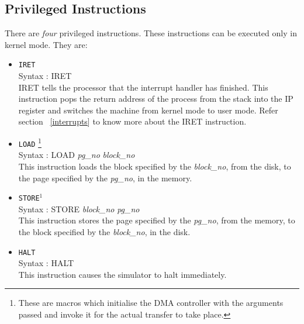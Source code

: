 \subsection{Privileged Instructions}
\label{sec:prvlgd}
There are \emph{four} privileged instructions. These instructions can be executed only in kernel mode. They are:
\begin{itemize}
	\item \texttt{IRET} \\
	Syntax : IRET \\
	IRET tells the processor that the interrupt handler has finished. This instruction pops the return address of the process from the stack into the IP register and switches the machine from kernel mode to user mode.
	Refer section ~\ref{interrupts} to know more about the IRET instruction.
	
	\item \texttt{LOAD}  \footnote{These are macros which initialise the DMA controller with the arguments passed and invoke it for the actual transfer to take place.}
	\\ Syntax : LOAD \emph{pg\_no} \emph{block\_no} \\
	This instruction loads the block specified by the  \emph{block\_no}, from the disk, to the page specified by the  \emph{pg\_no}, in the memory.
	
	\item \texttt{STORE$^{1}$}  \\
	Syntax : STORE \emph{block\_no} \emph{pg\_no} \\ 
	This instruction stores the page specified by the \emph{pg\_no}, from the memory, to the block specified by the \emph{block\_no}, in the disk.
	
	\item \texttt{HALT} \\
	Syntax : HALT \\
	This instruction causes the simulator to halt immediately.
\end{itemize}

